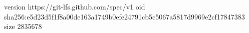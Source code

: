 version https://git-lfs.github.com/spec/v1
oid sha256:e5d23d5f1f8a00de163a1749b0efe24791cb5c5067a5817d9969e2cf17847383
size 2835678
